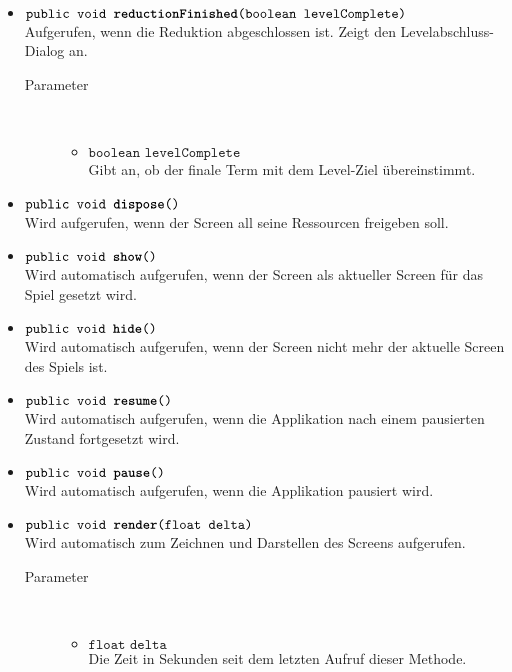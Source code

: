\begin{description}
\begin{itemize}
		\item $\texttt{public void \textbf{reductionFinished}(boolean levelComplete)}$ \\ Aufgerufen, wenn die Reduktion abgeschlossen ist. Zeigt den Levelabschluss-Dialog an.
		\begin{description}
			\item[Parameter] \hfill \\
			\vspace{-.8cm}
			\begin{itemize}
				\item $\texttt{boolean levelComplete}$ \\ Gibt an, ob der finale Term mit dem Level-Ziel übereinstimmt.
			\end{itemize}
		\end{description}
				
		\item $\texttt{public void \textbf{dispose}()}$ \\ Wird aufgerufen, wenn der Screen all seine Ressourcen freigeben soll.
		
		\item $\texttt{public void \textbf{show}()}$ \\ Wird automatisch aufgerufen, wenn der Screen als aktueller Screen für das Spiel gesetzt wird.
	
		\item $\texttt{public void \textbf{hide}()}$ \\ Wird automatisch aufgerufen, wenn der Screen nicht mehr der aktuelle Screen des Spiels ist.
	
		\item $\texttt{public void \textbf{resume}()}$ \\ Wird automatisch aufgerufen, wenn die Applikation nach einem pausierten Zustand fortgesetzt wird.	
	
		\item $\texttt{public void \textbf{pause}()}$ \\ Wird automatisch aufgerufen, wenn die Applikation pausiert wird.
	
		\item $\texttt{public void \textbf{render}(float delta)}$ \\ Wird automatisch zum Zeichnen und Darstellen des Screens aufgerufen.
		\begin{description}
			\item[Parameter] \hfill \\
			\vspace{-.8cm}
			\begin{itemize}
				\item $\texttt{float delta}$ \\ Die Zeit in Sekunden seit dem letzten Aufruf dieser Methode.
			\end{itemize}
		\end{description}	
	

\end{itemize}
\end{description}
